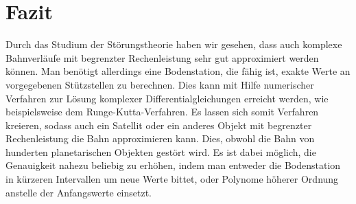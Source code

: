 \section{Fazit}
Durch das Studium der Störungstheorie haben wir gesehen, dass auch komplexe Bahnverläufe mit begrenzter Rechenleistung sehr gut approximiert werden können.
Man benötigt allerdings eine Bodenstation, die fähig ist, exakte Werte an vorgegebenen Stützstellen zu berechnen.
Dies kann mit Hilfe numerischer Verfahren zur Lösung komplexer Differentialgleichungen erreicht werden, wie beispielsweise dem Runge-Kutta-Verfahren.
Es lassen sich somit Verfahren kreieren, sodass auch ein Satellit oder ein anderes Objekt mit begrenzter Rechenleistung die Bahn approximieren kann.
Dies, obwohl die Bahn von hunderten planetarischen Objekten gestört wird.
Es ist dabei möglich, die Genauigkeit nahezu beliebig zu erhöhen, indem man entweder die Bodenstation in kürzeren Intervallen um neue Werte bittet,
oder Polynome höherer Ordnung anstelle der Anfangswerte einsetzt.